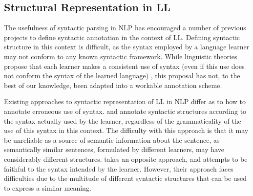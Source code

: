 \documentclass[letter,11pt]{article}
\begin{document}
		
		\subsection{Structural Representation in LL}
		
		The usefulness of syntactic parsing in NLP has encouraged a number of previous
		projects to define syntactic annotation in the context of LL.
		Defining syntactic structure in this context is difficult, as the syntax employed
		by a language learner may not conform to any known syntactic framework.
		While linguistic theories propose that each learner
		makes a consistent use of syntax (even if this use does not conform the 
		syntax of the learned language) \cite{huebner1985system,tarone1983variability},
		this proposal has not, to the best of our knowledge, been adapted into a workable
		annotation scheme.
		
		Existing approaches to syntactic representation of LL in NLP
		differ as to how to annotate erroneous use of syntax.
		 and 
		annotate syntactic structures according to the syntax actually used
		by the learner, regardless of the grammaticality of the use of this
		syntax in this context.
		The difficulty with this approach is that it may be unreliable as
		a source of semantic information about the sentence, as semantically similar
		sentences, formulated by different learners, may have considerably different
		structures.  takes an opposite approach, and attempts
		to be faithful to the syntax intended by the learner. However, their
		approach faces difficulties due to the multitude of different syntactic
		structures that can be used to express a similar meaning.
		
		
\end{document}
